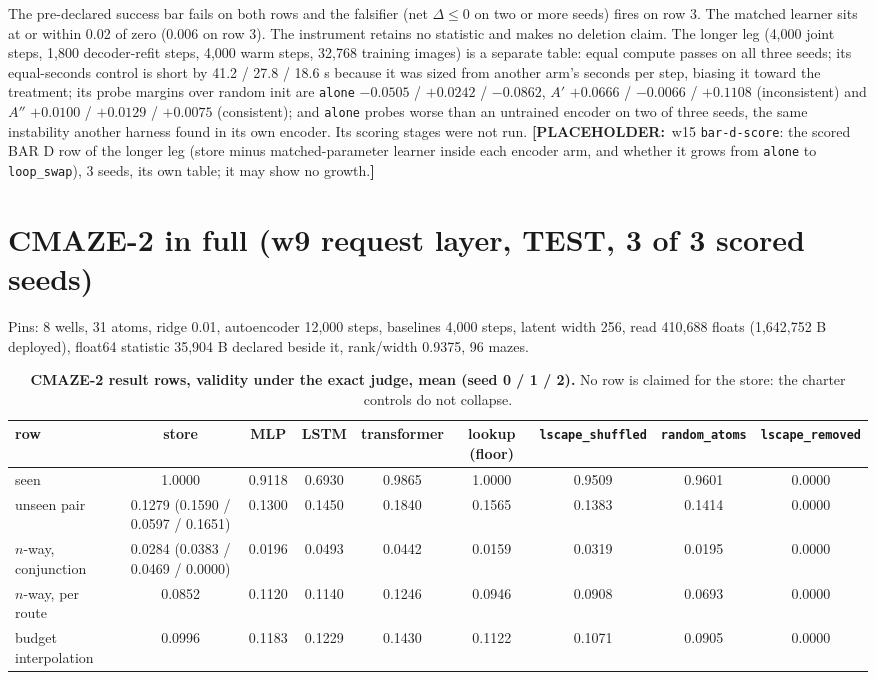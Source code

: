 \documentclass{article}
\newcommand{\PLACEHOLDER}[1]{{\color{red}\textbf{[PLACEHOLDER:}~#1\textbf{]}}}
\begin{document}
\noindent The pre-declared success bar fails on both rows and the falsifier (net $\Delta\le0$ on two
or more seeds) fires on row 3. The matched learner sits at or within 0.02 of zero (0.006 on row 3).
The instrument retains no statistic and makes no deletion claim.
The longer leg (4,000 joint steps, 1,800 decoder-refit steps, 4,000 warm steps, 32,768 training
images) is a separate table: equal compute passes on all three seeds; its equal-seconds control is
short by 41.2 / 27.8 / 18.6 s because it was sized from another arm's seconds per step, biasing it
toward the treatment; its probe margins over random init are \texttt{alone} $-0.0505$ / $+0.0242$ /
$-0.0862$, $A'$ $+0.0666$ / $-0.0066$ / $+0.1108$ (inconsistent) and $A''$ $+0.0100$ / $+0.0129$ /
$+0.0075$ (consistent); and \texttt{alone} probes worse than an untrained encoder on two of three
seeds, the same instability another harness found in its own encoder. Its scoring stages were not
run.
\PLACEHOLDER{w15 \texttt{bar-d-score}: the scored BAR D row of the longer leg (store minus
matched-parameter learner inside each encoder arm, and whether it grows from \texttt{alone} to
\texttt{loop\_swap}), 3 seeds, its own table; it may show no growth.}

\section{CMAZE-2 in full (w9 request layer, TEST, 3 of 3 scored seeds)}
\label{app:cmaze2}

Pins: 8 wells, 31 atoms, ridge 0.01, autoencoder 12,000 steps, baselines 4,000 steps, latent width
256, read 410,688 floats (1,642,752 B deployed), float64 statistic 35,904 B declared beside it,
rank/width 0.9375, 96 mazes.

\begin{table}[h]
\centering\scriptsize
\caption{\textbf{CMAZE-2 result rows, validity under the exact judge, mean (seed 0 / 1 / 2).} No
row is claimed for the store: the charter controls do not collapse.}
\label{tab:cmaze2}
\setlength{\tabcolsep}{1.8pt}
\begin{adjustbox}{max width=\linewidth}\begin{tabular}{lcccccccc}
\toprule
row & store & MLP & LSTM & transformer & lookup (floor) & \texttt{lscape\_shuffled} & \texttt{random\_atoms} & \texttt{lscape\_removed} \\
\midrule
seen & 1.0000 & 0.9118 & 0.6930 & 0.9865 & 1.0000 & 0.9509 & 0.9601 & 0.0000 \\
unseen pair & 0.1279 (0.1590 / 0.0597 / 0.1651) & 0.1300 & 0.1450 & 0.1840 & 0.1565 & 0.1383 & 0.1414 & 0.0000 \\
$n$-way, conjunction & 0.0284 (0.0383 / 0.0469 / 0.0000) & 0.0196 & 0.0493 & 0.0442 & 0.0159 & 0.0319 & 0.0195 & 0.0000 \\
$n$-way, per route & 0.0852 & 0.1120 & 0.1140 & 0.1246 & 0.0946 & 0.0908 & 0.0693 & 0.0000 \\
budget interpolation & 0.0996 & 0.1183 & 0.1229 & 0.1430 & 0.1122 & 0.1071 & 0.0905 & 0.0000 \\
\bottomrule
\end{tabular}\end{adjustbox}
\end{table}
\end{document}

